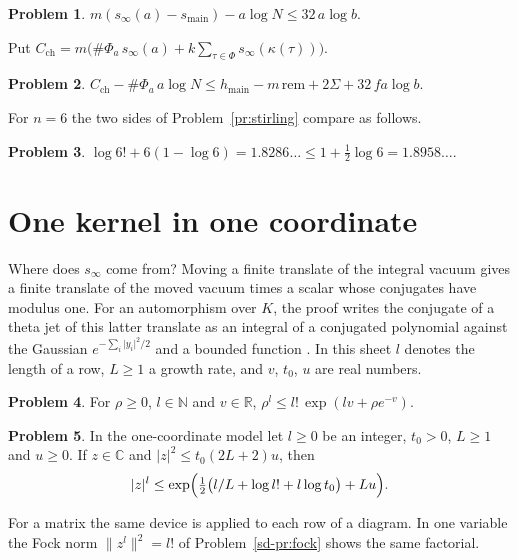 \documentclass[reqno]{amsart}
\theoremstyle{definition}
\newtheorem{problem}{Problem}[section]
\theoremstyle{plain}
\theoremstyle{remark}
\newcommand{\R}{\mathbb{R}}
\newcommand{\C}{\mathbb{C}}
\newcommand{\rem}{\mathrm{rem}}
\newcommand{\hm}{h_{\mathrm{main}}}
\newcommand{\sinf}{s_\infty}
\newcommand{\smain}{s_{\mathrm{main}}}
\newcommand{\Cch}{C_{\mathrm{ch}}}
\begin{document}
\begin{problem}\label{pr:level-pays}
\(m(\sinf(a) - \smain) - a\log N \le 32\,a\log b\).
\end{problem}

Put \(\Cch = m\bigl(\#\Phi_a\,\sinf(a) + k\sum_{\tau \in \Phi}\sinf(\kappa(\tau))\bigr)\).

\begin{problem}\label{pr:chain-size}
\(\Cch - \#\Phi_a\,a\log N \le \hm - m\,\rem + 2\Sigma + 32\,fa\log b\).
\end{problem}

For \(n = 6\) the two sides of Problem~\ref{pr:stirling} compare as follows.

\begin{problem}\label{pr:stirling-six}
\(\log 6! + 6(1 - \log 6) = 1.8286\ldots \le 1 + \frac12\log 6 = 1.8958\ldots\).
\end{problem}

\section{One kernel in one coordinate}\label{sec:kernel}

Where does \(\sinf\) come from?  Moving a finite translate of the integral vacuum gives a finite translate of the moved vacuum times a scalar whose conjugates have modulus one.  For an automorphism over \(K\), the proof writes the conjugate of a theta jet of this latter translate as an integral of a conjugated polynomial against the Gaussian \(e^{-\sum_i\lvert y_i\rvert^2/2}\) and a bounded function \cite{GL}.  In this sheet \(l\) denotes the length of a row, \(L \ge 1\) a growth rate, and \(v\), \(t_0\), \(u\) are real numbers.

\begin{problem}\label{pr:factorial-device}
For \(\rho \ge 0\), \(l \in \mathbb{N}\) and \(v \in \R\), \(\rho^l \le l!\,\exp(lv + \rho e^{-v})\).
\end{problem}

\begin{problem}\label{pr:one-row}
In the one-coordinate model let \(l \ge 0\) be an integer, \(t_0 > 0\), \(L \ge 1\) and \(u \ge 0\).  If \(z \in \C\) and \(\lvert z\rvert^2 \le t_0(2L + 2)u\), then
\[
  \lvert z\rvert^l \le \exp\Bigl(\tfrac12\bigl(l/L + \log l! + l\log t_0\bigr) + Lu\Bigr) .
\]
\end{problem}

For a matrix the same device is applied to each row of a diagram.  In one variable the Fock norm \(\lVert z^l\rVert^2 = l!\) of Problem~\ref{sd-pr:fock} shows the same factorial.
\end{document}
